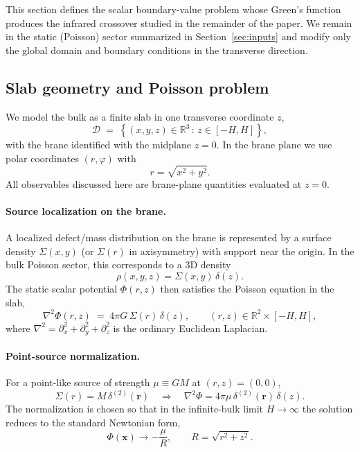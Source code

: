 \documentclass[11pt]{article}
\begin{document}
This section defines the scalar boundary-value problem whose Green's function produces the infrared
crossover studied in the remainder of the paper.
We remain in the static (Poisson) sector summarized in
Section~\ref{sec:inputs} and modify only the global domain and boundary conditions in the transverse
direction.

\subsection{Slab geometry and Poisson problem}
\label{sec:slab_geometry}

We model the bulk as a finite slab in one transverse coordinate $z$,
\begin{equation}
  \mathcal{D} \;=\; \left\{ (x,y,z)\in\mathbb{R}^3 \,:\, z\in[-H,H] \right\},
\end{equation}
with the brane identified with the midplane $z=0$.
In the brane plane we use polar coordinates $(r,\varphi)$ with
\begin{equation}
  r=\sqrt{x^2+y^2}.
\end{equation}
All observables discussed here are brane-plane quantities evaluated at $z=0$.

\paragraph{Source localization on the brane.}
A localized defect/mass distribution on the brane is represented by a surface density
$\Sigma(x,y)$ (or $\Sigma(r)$ in axisymmetry) with support near the origin.
In the bulk Poisson sector, this corresponds to a 3D density
\begin{equation}
  \rho(x,y,z) = \Sigma(x,y)\,\delta(z).
\end{equation}
The static scalar potential $\Phi(r,z)$ then satisfies the Poisson equation in the slab,
\begin{equation}
  \nabla^2 \Phi(r,z) \;=\; 4\pi G\,\Sigma(r)\,\delta(z),
  \qquad (r,z)\in \mathbb{R}^2\times[-H,H],
  \label{eq:slab_poisson}
\end{equation}
where $\nabla^2=\partial_x^2+\partial_y^2+\partial_z^2$ is the ordinary Euclidean Laplacian.

\paragraph{Point-source normalization.}
For a point-like source of strength $\mu\equiv GM$ at $(r,z)=(0,0)$,
\begin{equation}
  \Sigma(r)=M\,\delta^{(2)}(\mathbf{r}) \quad \Longrightarrow \quad
  \nabla^2 \Phi = 4\pi \mu\,\delta^{(2)}(\mathbf{r})\,\delta(z).
\end{equation}
The normalization is chosen so that in the infinite-bulk limit $H\to\infty$ the solution reduces to
the standard Newtonian form,
\begin{equation}
  \Phi(\mathbf{x}) \to -\frac{\mu}{R},\qquad R=\sqrt{r^2+z^2}.
\end{equation}
\end{document}
